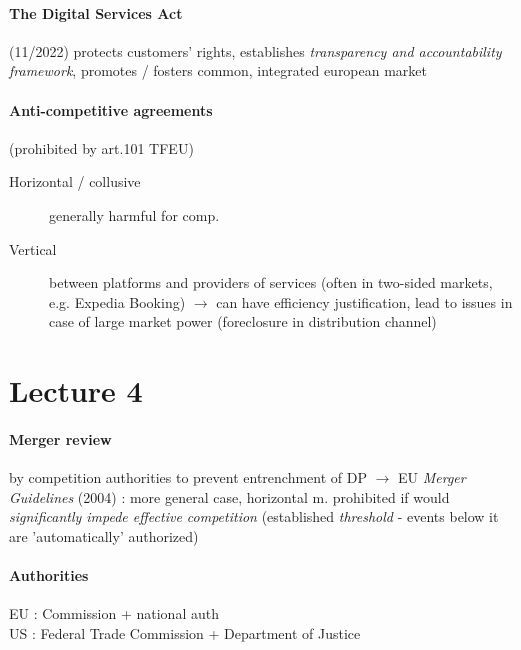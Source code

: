 \documentclass[10pt]{article}
\begin{document}
\paragraph{The Digital Services Act} (11/2022) protects customers' rights, establishes \textit{transparency and accountability framework}, promotes / fosters common, integrated european market

\paragraph{Anti-competitive agreements} (prohibited by art.101 TFEU)
\begin{description}
    \item[Horizontal / collusive] generally harmful for comp.
    \item[Vertical] between platforms and providers of services (often in two-sided markets, e.g. Expedia Booking) $\rightarrow$ can have efficiency justification, lead to issues in case of large market power (foreclosure in distribution channel)
\end{description}

\section{Lecture 4}

\paragraph{Merger review} by competition authorities to prevent entrenchment of DP $\rightarrow$ EU \textit{Merger Guidelines} (2004) : more general case, horizontal m. prohibited if would \textit{significantly impede effective competition} (established \textit{threshold} - events below it are 'automatically' authorized)

\paragraph{Authorities} EU : Commission + national auth
\\US : Federal Trade Commission + Department of Justice
\end{document}
